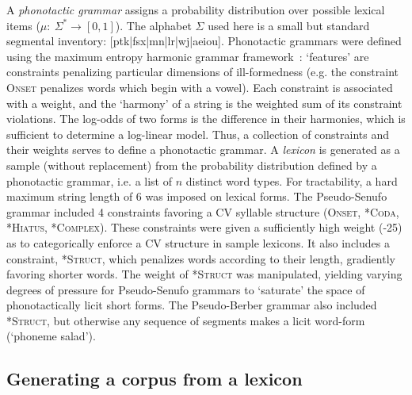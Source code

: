 \documentclass[11pt]{article}
\begin{document}
A \textit{phonotactic grammar} assigns a probability distribution over possible lexical items ($\mu:~\Sigma^* \rightarrow[0,1]$). The alphabet $\Sigma$ used here is a small but standard segmental inventory: [ptk|fsx|mn|lr|wj|aeiou]. Phonotactic grammars were defined using the maximum entropy harmonic grammar framework~\cite{Hayes08a}: `features' are constraints penalizing particular dimensions of ill-formedness (e.g. the constraint \textsc{Onset} penalizes words which begin with a vowel). Each constraint is associated with a weight, and the `harmony' of a string is the weighted sum of its constraint violations. The log-odds of two forms is the difference in their harmonies, which is sufficient to determine a log-linear model. Thus, a collection of constraints and their weights serves to define a phonotactic grammar. A \textit{lexicon} is generated as a sample (without replacement) from the probability distribution defined by a phonotactic grammar, i.e. a list of $n$ distinct word types. For tractability, a hard maximum string length of 6 was imposed on lexical forms. The Pseudo-Senufo grammar included 4 constraints favoring a CV syllable structure (\textsc{Onset, *Coda, *Hiatus, *Complex}). These constraints were given a sufficiently high weight (-25) as to categorically enforce a CV structure in sample lexicons. It also includes a constraint, \textsc{*Struct}, which penalizes words according to their length, gradiently favoring shorter words. The weight of \textsc{*Struct} was manipulated, yielding varying degrees of pressure for Pseudo-Senufo grammars to `saturate' the space of phonotactically licit short forms. The Pseudo-Berber grammar also included \textsc{*Struct}, but otherwise any sequence of segments makes a licit word-form (`phoneme salad'). 

\subsection{Generating a corpus from a lexicon}
\end{document}
